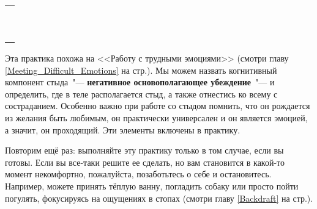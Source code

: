 \setlength{\extrarowheight}{2mm}
\begin{tabularx}{\textwidth}{X}
	\\
	\arrayrulecolor{gray}\hline\\
	\hline\\
	\hline\\
	\hline\\
	\hline\\
	\hline\\	
	\hline\\
	\hline\\
	\hline\\
	\hline\\
	\hline\\
\end{tabularx}
\setlength{\extrarowheight}{0mm}


 \label{IP:Working_with_Shame}

Эта практика похожа на <<Работу с трудными эмоциями>> (смотри главу \ref{Meeting_Difficult_Emotions} на стр.\:\pageref{IP:Working_with_Difficult_Emotions}). Мы можем назвать когнитивный компонент стыда~"--- \textbf{негативное основополагающее убеждение}~"--- и определить, где в теле располагается стыд, а также отнестись ко всему с состраданием. Особенно важно при работе со стыдом помнить, что он рождается из желания быть любимым, он практически универсален и он является эмоцией, а значит, он проходящий. Эти элементы включены в практику.

Повторим ещё раз: выполняйте эту практику только в том случае, если вы готовы. Если вы все-таки решите ее сделать, но вам становится в какой-то момент некомфортно, пожалуйста, позаботьтесь о себе и остановитесь. Например, можете принять тёплую ванну, погладить собаку или просто пойти погулять, фокусируясь на ощущениях в стопах (смотри главу \ref{Backdraft} на стр.\:\pageref{IP:Feeling_the_Soles_of_Your_Feet}).

